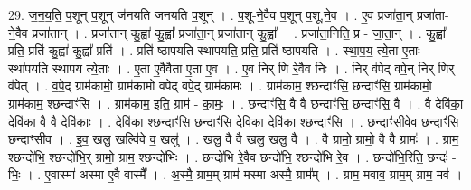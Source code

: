 \documentclass[17pt]{extarticle}
\begin{document}
29. ज॒न॒य॒ति॒ प॒शून् प॒शून् ज॑नयति जनयति प॒शून् । . प॒शू-ने॒वैव प॒शून् प॒शू,ने॒व । . ए॒व प्रजा॑ता॒न् प्रजा॑ता-ने॒वैव प्रजा॑तान् । . प्रजा॑तान् कु॒ह्वा॑ कु॒ह्वा᳚ प्रजा॑ता॒न् प्रजा॑तान् कु॒ह्वा᳚ । . प्रजा॑ता॒निति॒ प्र - जा॒ता॒न् । . कु॒ह्वा᳚ प्रति॒ प्रति॑ कु॒ह्वा॑ कु॒ह्वा᳚ प्रति॑ । . प्रति॑ ष्ठापयति स्थापयति॒ प्रति॒ प्रति॑ ष्ठापयति । . स्था॒प॒य॒ त्ये॒ता ए॒ताः स्था॑पयति स्थापय त्ये॒ताः । . ए॒ता ए॒वैवैता ए॒ता ए॒व । . ए॒व निर् णि रे॒वैव निः । . निर् व॑पेद् वपे॒न् निर् णिर् व॑पेत् । . व॒पे॒द् ग्राम॑कामो॒ ग्राम॑कामो वपेद् वपे॒द् ग्राम॑कामः । . ग्राम॑काम॒ श्छन्दाꣳ॑सि॒ छन्दाꣳ॑सि॒ ग्राम॑कामो॒ ग्राम॑काम॒ श्छन्दाꣳ॑सि । . ग्राम॑काम॒ इति॒ ग्राम॑ - का॒मः॒ । . छन्दाꣳ॑सि॒ वै वै छन्दाꣳ॑सि॒ छन्दाꣳ॑सि॒ वै । . वै देवि॑का॒ देवि॑का॒ वै वै देवि॑काः । . देवि॑का॒ श्छन्दाꣳ॑सि॒ छन्दाꣳ॑सि॒ देवि॑का॒ देवि॑का॒ श्छन्दाꣳ॑सि । . छन्दाꣳ॑सीवेव॒ छन्दाꣳ॑सि॒ छन्दाꣳ॑सीव । . इ॒व॒ खलु॒ खल्वि॑वे व॒ खलु॑ । . खलु॒ वै वै खलु॒ खलु॒ वै । . वै ग्रामो॒ ग्रामो॒ वै वै ग्रामः॑ । . ग्राम॒ श्छन्दो॑भि॒ श्छन्दो॑भि॒र् ग्रामो॒ ग्राम॒ श्छन्दो॑भिः । . छन्दो॑भि रे॒वैव छन्दो॑भि॒ श्छन्दो॑भि रे॒व । . छन्दो॑भि॒रिति॒ छन्दः॑ - भिः॒ । . ए॒वास्मा॑ अस्मा ए॒वै वास्मै᳚ । . अ॒स्मै॒ ग्राम॒म् ग्राम॑ मस्मा अस्मै॒ ग्राम᳚म् । . ग्राम॒ मवाव॒ ग्राम॒म् ग्राम॒ मव॑ । \newline
\end{document}
